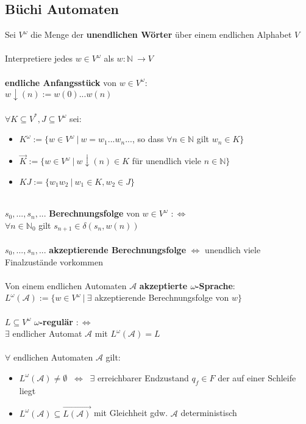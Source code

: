 \documentclass[a4paper,11pt]{scrartcl}
\newcommand{\calA}{\mathcal{A}}
\newcommand{\tbf}{\textbf}
\newcommand{\Lra}{\Leftrightarrow}
\newcommand{\nat}{\mathbb{N}}
\newcommand{\Vo}{V^\omega}
\theoremstyle{default}
\begin{document}
\subsection{Büchi Automaten}
Sei $\Vo$ die Menge der \tbf{unendlichen Wörter} über einem endlichen Alphabet $V$ \\
\ \\ Interpretiere jedes $w \in \Vo$ als $w: \nat \ \rightarrow V$ \\
\ \\ \tbf{endliche Anfangsstück} von $w \in \Vo$: \\
$w \downarrow (n) := w(0) ... w(n)$ \\
\ \\ $\forall K \subseteq V^*, J \subseteq \Vo$ sei: 
\begin{itemize}
 \item $K^\omega := \{ w \in \Vo \ | \ w = w_1 ... w_n ...$, so dass $\forall n \in \nat$ gilt $w_n \in K \}$
 \item $\vec K := \{ w \in \Vo \ | \ w \downarrow (n) \in K$ für unendlich viele $n \in \nat \}$
 \item $KJ := \{ w_1 w_2 \ | \ w_1 \in K, w_2 \in J \}$
\end{itemize}
\ \\ $s_0, ..., s_n, ...$ \tbf{Berechnungsfolge} von $w \in \Vo$ $:\Lra$ \\
$\forall n \in \nat_0$ gilt $s_{n+1} \in \delta(s_n, w(n))$ \\
\ \\ $s_0, ..., s_n, ...$ \tbf{akzeptierende Berechnungsfolge} $\Lra$ unendlich viele Finalzustände vorkommen \\
\ \\ Von einem endlichen Automaten $\calA$ \tbf{akzeptierte $\omega$-Sprache}: \\
$L^\omega(\calA) := \{ w \in \Vo \ | \ \exists$ akzeptierende Berechnungsfolge von $w \}$ \\
\ \\ $L \subseteq \Vo$ \tbf{$\omega$-regulär} $:\Lra$ \\
$\exists$ endlicher Automat $\calA$ mit $L^\omega(\calA) = L$ \\
\ \\ $\forall$ endlichen Automaten $\calA$ gilt:
\begin{itemize}
 \item $L^\omega(\calA) \not = \emptyset$ $\ \Lra \ $ $\exists$ erreichbarer Endzustand $q_f \in F$ der auf einer Schleife liegt
 \item $L^\omega(\calA) \subseteq \overset{\longrightarrow}{L(\calA)}$ mit Gleichheit gdw. $\calA$ deterministisch
\end{itemize}
\end{document}
